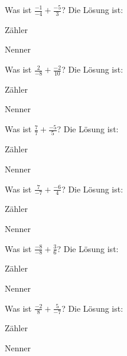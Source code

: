 \documentclass{ximera}
\begin{document}
\begin{shuffle}
\begin{question}
Was ist $\frac{-1}{-4} + \frac{-5}{3}$?
Die Lösung ist:
\begin{solution}
Zähler 
\end{solution}
\begin{solution}
Nenner 
\end{solution}
\end{question}


\begin{question}
Was ist $\frac{2}{-8} + \frac{-2}{10}$?
Die Lösung ist:
\begin{solution}
Zähler 
\end{solution}
\begin{solution}
Nenner 
\end{solution}
\end{question}


\begin{question}
Was ist $\frac{7}{7} + \frac{-5}{5}$?
Die Lösung ist:
\begin{solution}
Zähler 
\end{solution}
\begin{solution}
Nenner 
\end{solution}
\end{question}


\begin{question}
Was ist $\frac{7}{-7} + \frac{-6}{4}$?
Die Lösung ist:
\begin{solution}
Zähler 
\end{solution}
\begin{solution}
Nenner 
\end{solution}
\end{question}


\begin{question}
Was ist $\frac{-8}{-8} + \frac{3}{6}$?
Die Lösung ist:
\begin{solution}
Zähler 
\end{solution}
\begin{solution}
Nenner 
\end{solution}
\end{question}


\begin{question}
Was ist $\frac{-2}{8} + \frac{5}{-7}$?
Die Lösung ist:
\begin{solution}
Zähler 
\end{solution}
\begin{solution}
Nenner 
\end{solution}
\end{question}



\end{shuffle}
\end{document}
